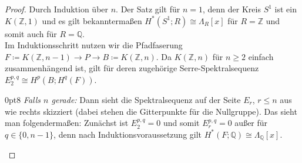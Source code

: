 \documentclass[11pt, a4paper, german]{article}
\theoremstyle{definition}
\theoremstyle{remark}
\newcommand{\Z}{\mathbb{Z}} %
\newcommand{\Q}{\mathbb{Q}} %
\newcommand{\zeroDot}[2]{\node[draw,circle,inner sep=0.4pt,fill] at (#1,#2) {};} %
\begin{document}
\begin{proof}
  Durch Induktion über $n$.
  Der Satz gilt für $n = 1$, denn der Kreis $S^1$ ist ein $K(\Z, 1)$ und es gilt bekanntermaßen $H^*(S^1; R) \cong \Lambda_R[x]$ für $R = \Z$ und somit auch für $R = \Q$. \\
  Im Induktionsschritt nutzen wir die Pfadfaserung $F \coloneqq K(\Z, n{-}1) \to P \to B \coloneqq K(\Z, n)$. Da $K(\Z, n)$ für $n \geq 2$ einfach zusammenhängend ist, gilt für deren zugehörige Serre-Spektralsequenz
  $E_2^{p,q} \cong H^p(B; H^q(F))$.

  \vspace{0.5cm}

  \renewcommand\windowpagestuff{
    \begin{center}\begin{tikzpicture}[x=16pt,y=16pt]\begin{scope}[shift={(0,0)}]
      \foreach \x in {1,2,3,5,6,7}{
        \foreach \y in {0,1,...,3}{
          \zeroDot{\x}{\y}
        }
      }
      \foreach \x in {0,...,8}{
        \zeroDot{\x}{4}
      }
      \foreach \y in {0,...,4}{
        \node at (9.5,\y) {$\cdots$};
      }
      \node at (0,0) {$\Q$\small $1$};
      \zeroDot{0}{1}
      \zeroDot{0}{2}
      \node at (0,3) {$\Q$\small $a$};
      \node at (4,0) {$\Q$\small $x$};
      \zeroDot{4}{1}
      \zeroDot{4}{2}
      \node at (4,3) {$\Q$\small $ax$};
      \draw[->,gray] (0.6,2.6) -- (3.4,0.4);
      \node at (8,0) {$\Q$\small $x^2$};
      \zeroDot{8}{1}
      \zeroDot{8}{2}
      \node at (8,3) {$\Q$\small $ax^2$};
      \draw[->,gray] (4.6,2.6) -- (7.4,0.4);
      \draw[->] (-0.7,-0.6) -- (10.3,-0.6); %
      \draw[->] (-0.7,-0.6) -- (-0.7,4.5); %
      \node[left] at (-0.7,0) {$0$};
      \node[left] at (-0.9,1.7) {\vdots};
      \node[left] at (-0.7,3) {$n{-}1$};
      \node[below] at (0,-0.6) {$0$};
      \node[below] at (2,-0.7) {$\cdots$};
      \node[below] at (4,-0.7) {$n$};
      \node[below] at (6,-0.7) {$\cdots$};
      \node[below] at (8,-0.6) {$2n$};
      \node[below] at (9.5,-0.7) {$\cdots$};
    \end{scope}\end{tikzpicture}\end{center}
  }
  \opencutright
  \begin{cutout}{0}{\dimexpr\linewidth-8cm\relax}{0pt}{8}
    \emph{Falls $n$ gerade:} \enspace
    Dann sieht die Spektralsequenz auf der Seite $E_r$, $r \leq n$ aus wie rechts skizziert (dabei stehen die Gitterpunkte für die Nullgruppe).
    Das sieht man folgendermaßen: Zunächst ist $E_2^{p,q} = 0$ und somit $E_r^{p,q} = 0$ außer für $q \in \{ 0, n{-}1 \}$, denn nach Induktionsvoraussetzung gilt $H^*(F; \Q) \cong \Lambda_\Q[x]$.

\end{cutout}
\end{proof}
\end{document}
